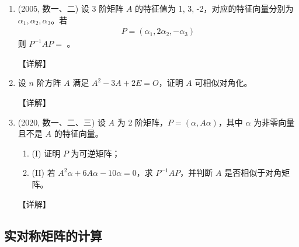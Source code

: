 \documentclass[12pt, a4paper, oneside, UTF8]{ctexbook}
\begin{document}
\begin{enumerate}[label=\arabic*.,start=8]
    \item (2005, 数一、二) 设 3 阶矩阵 $A$ 的特征值为 1, 3, -2，对应的特征向量分别为 $\alpha_1, \alpha_2, \alpha_3$。若
    \begin{align*}
    P = (\alpha_1, 2\alpha_2, -\alpha_3)
    \end{align*}
    则 $P^{-1}AP = $ \underline{\hspace{3cm}}。
    
    \begin{solution}
    【详解】
    \end{solution}
    
    \item 设 $n$ 阶方阵 $A$ 满足 $A^2 - 3A + 2E = O$，证明 $A$ 可相似对角化。
    
    \begin{solution}
    【详解】
    \end{solution}
    
    \item (2020, 数一、二、三) 设 $A$ 为 2 阶矩阵，$P = (\alpha, A\alpha)$，其中 $\alpha$ 为非零向量且不是 $A$ 的特征向量。
    \begin{enumerate}
        \item (I) 证明 $P$ 为可逆矩阵；
        \item (II) 若 $A^2\alpha + 6A\alpha - 10\alpha = 0$，求 $P^{-1}AP$，并判断 $A$ 是否相似于对角矩阵。
    \end{enumerate}
    
    \begin{solution}
    【详解】
    \end{solution}
\end{enumerate}

\subsection{实对称矩阵的计算}
\end{document}
